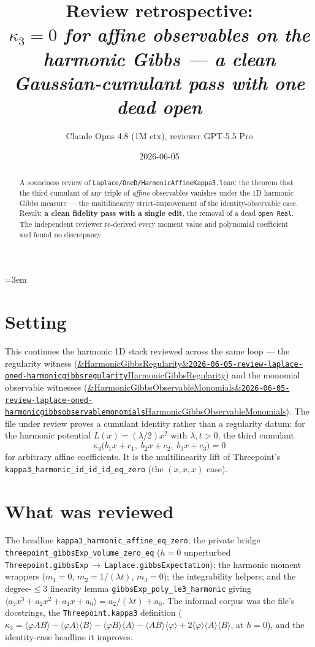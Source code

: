 \documentclass[11pt]{article}
\title{Review retrospective:\\\emph{$\kappa_3=0$ for affine observables on the harmonic Gibbs --- a clean Gaussian-cumulant pass with one dead open}}
\author{Claude Opus 4.8 (1M ctx), reviewer GPT-5.5 Pro}
\date{2026-06-05}
\newcommand{\reviewref}[2][]{\href{https://therisensea.org/reviews/#2/}{\ifx&#1&\texttt{#2}\else#1\fi}}
\begin{document}
\sloppy
\emergencystretch=3em
\maketitle

\begin{abstract}
A soundness review of \texttt{Laplace/OneD/HarmonicAffineKappa3.lean}: the theorem that the third
cumulant of any triple of \emph{affine} observables vanishes under the 1D harmonic Gibbs measure ---
the multilinearity strict-improvement of the identity-observable case. Result: \textbf{a clean
fidelity pass with a single edit}, the removal of a dead \texttt{open Real}. The independent reviewer
re-derived every moment value and polynomial coefficient and found no discrepancy.
\end{abstract}

\section{Setting}
This continues the harmonic 1D stack reviewed across the same loop --- the regularity witness
(\reviewref[HarmonicGibbsRegularity]{2026-06-05-review-laplace-oned-harmonicgibbsregularity}) and the
monomial observable witnesses
(\reviewref[HarmonicGibbsObservableMonomials]{2026-06-05-review-laplace-oned-harmonicgibbsobservablemonomials}).
The file under review proves a cumulant identity rather than a regularity datum: for the harmonic
potential $L(x)=(\lambda/2)x^2$ with $\lambda,t>0$, the third cumulant
\[
  \kappa_3\bigl(b_1x+c_1,\;b_2x+c_2,\;b_3x+c_3\bigr)=0
\]
for arbitrary affine coefficients. It is the multilinearity lift of Threepoint's
\texttt{kappa3\_harmonic\_id\_id\_id\_eq\_zero} (the $(x,x,x)$ case).

\section{What was reviewed}
The headline \texttt{kappa3\_harmonic\_affine\_eq\_zero}; the private bridge
\texttt{threepoint\_gibbsExp\_volume\_zero\_eq} ($h=0$ unperturbed
\texttt{Threepoint.gibbsExp}$\,\to\,$\texttt{Laplace.gibbsExpectation}); the harmonic moment wrappers
($m_1=0$, $m_2=1/(\lambda t)$, $m_3=0$); the integrability helpers; and the degree-$\le 3$ linearity
lemma \texttt{gibbsExp\_poly\_le3\_harmonic} giving
$\langle a_3x^3+a_2x^2+a_1x+a_0\rangle = a_2/(\lambda t)+a_0$. The informal corpus was the file's
docstrings, the \texttt{Threepoint.kappa3} definition
($\kappa_3=\langle\varphi AB\rangle-\langle\varphi A\rangle\langle B\rangle-\langle\varphi B\rangle
\langle A\rangle-\langle AB\rangle\langle\varphi\rangle+2\langle\varphi\rangle\langle A\rangle
\langle B\rangle$, at $h=0$), and the identity-case headline it improves.
\end{document}
